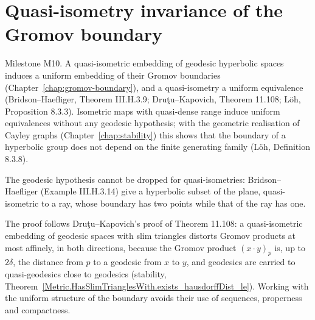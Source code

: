 \chapter{Quasi-isometry invariance of the Gromov boundary}
\label{chap:boundary-invariance}

Milestone M10. A quasi-isometric embedding of geodesic hyperbolic spaces induces a uniform embedding
of their Gromov boundaries (Chapter~\ref{chap:gromov-boundary}), and a quasi-isometry a uniform
equivalence (Bridson--Haefliger, Theorem III.H.3.9; Dru\c{t}u--Kapovich, Theorem 11.108;
L\"oh, Proposition 8.3.3). Isometric maps with quasi-dense range induce uniform equivalences without
any geodesic hypothesis; with the geometric realisation of Cayley graphs
(Chapter~\ref{chap:stability}) this shows that the boundary of a hyperbolic group does not depend
on the finite generating family (L\"oh, Definition 8.3.8).

The geodesic hypothesis cannot be dropped for quasi-isometries: Bridson--Haefliger
(Example III.H.3.14) give a hyperbolic subset of the plane, quasi-isometric to a ray, whose boundary
has two points while that of the ray has one.

The proof follows Dru\c{t}u--Kapovich's proof of Theorem 11.108: a quasi-isometric embedding of
geodesic spaces with slim triangles distorts Gromov products at most affinely, in both directions,
because the Gromov product $(x \cdot y)_p$ is, up to $2\delta$, the distance from $p$ to a geodesic
from $x$ to $y$, and geodesics are carried to quasi-geodesics close to geodesics (stability,
Theorem~\ref{Metric.HasSlimTrianglesWith.exists_hausdorffDist_le}). Working with the uniform
structure of the boundary avoids their use of sequences, properness and compactness.

